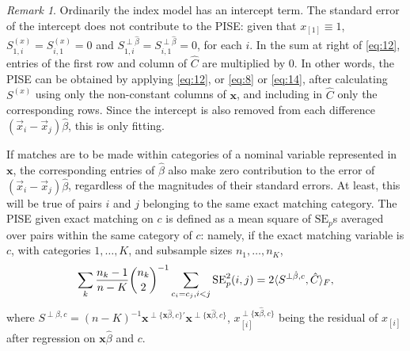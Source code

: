 \documentclass{article}
\theoremstyle{remark}
\newtheorem*{remark}{Remark}
\begin{document}
\begin{remark}
Ordinarily the index model has an intercept term. The standard error of the intercept does not contribute to the PISE: given that $x_{[1]} \equiv 1$,  $S^{(x)}_{1,i}= S^{(x)}_{i,1}=0$ and $S^{\perp \hat\beta}_{1,i}=S^{\perp \hat\beta}_{i,1}=0$, for each $i$. In the sum at right of \eqref{eq:12}, entries of the first row and column of $\hat{C}$ are multiplied by 0. In other words, the PISE can be obtained by applying \eqref{eq:12}, or \eqref{eq:8} or \eqref{eq:14}, after calculating $S^{(x)}$ using only the non-constant columns of $\mathbf{x}$, and including in $\hat C$ only the corresponding rows. Since the intercept is also removed from each difference $(\vec{x}_{i} - \vec{x}_{j})\hat{\beta}$, this is only fitting. 

If matches are to be made within categories of a nominal variable
represented in $\mathbf{x}$, the corresponding entries of $\hat\beta$
also make zero contribution to the error of
$(\vec{x}_{i} - \vec{x}_{j})\hat{\beta}$, regardless of the magnitudes
of their standard errors.  At least, this will be true of pairs $i$
and $j$ belonging to the same exact matching category.  The PISE given
exact matching on $c$   is defined as a mean square of
$ \mathrm{SE}_{p}$s averaged over pairs within the same category of
$c$: namely, if the exact matching variable is $c$, with categories
$1, \ldots, K$, and subsample sizes $n_{1}, \ldots, n_{K}$,
\begin{equation*}
  \sum_{k} \frac{n_{k} -1}{n-K} {n_{k} \choose 2}^{-1} \sum_{c_{i}=c_{j}, i<j}  \mathrm{SE}_{p}^{2}(i, j)= 2 \langle S^{\perp \hat\beta, c}, \hat{C}\rangle_{F},
\end{equation*}
where $S^{\perp \hat\beta, c} = (n-K)^{-1} \mathbf{x}^{\perp\{\mathbf{x}\hat\beta, c\}\prime}\mathbf{x}^{\perp\{\mathbf{x}\hat\beta, c\}}$, $x_{[i]}^{\perp\{\mathbf{x}\hat\beta, c\}}$ being the residual of $x_{[i]} $ after regression on $\mathbf{x}\hat\beta$ and $c$.
\end{remark}
\end{document}
